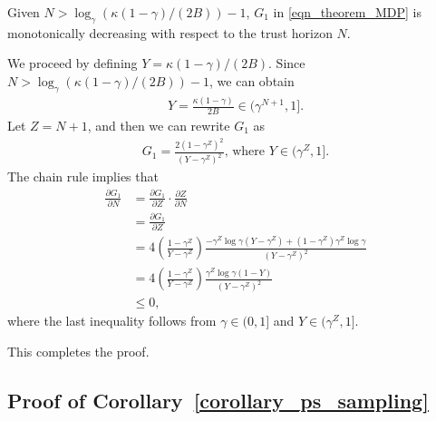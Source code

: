 \begin{lemma}\label{lemma_mono_decrease}
    Given $N > \log_\gamma \left( \kappa (1-\gamma)/(2B) \right)-1$, $G_1$ in \eqref{eqn_theorem_MDP} is monotonically decreasing with respect to the trust horizon $N$.
\end{lemma}
%
%
\begin{myproof}
    We proceed by defining $Y = \kappa (1-\gamma)/(2B)$.
    Since $N > \log_\gamma \left( \kappa (1-\gamma)/(2B) \right)-1$, we can obtain
    \begin{align}
        Y = \frac{\kappa \left( 1-\gamma \right)}{2B} \in (\gamma^{N+1}, 1].
    \end{align}
    Let $Z = N+1$, and then we can rewrite $G_1$ as
    \begin{align}
        G_1 = \frac{ 2 \left( 1-\gamma^{Z}\right)^2}{ \left(Y - \gamma^{Z}\right)^2}, \, \text{where} \,\, Y \in (\gamma^{Z}, 1].
    \end{align}
    The chain rule implies that
    \begin{align}
        \frac{\partial G_1}{\partial N} &= \frac{\partial G_1}{\partial Z} \cdot \frac{\partial Z}{\partial N} \\
        &=\frac{\partial G_1}{\partial Z} \\
        &=4 \left( \frac{1-\gamma^{Z}}{Y - \gamma^{Z}} \right) \frac{-\gamma^{Z} \log \gamma (Y - \gamma^{Z}) + (1-\gamma^{Z}) \gamma^{Z} \log \gamma }{(Y - \gamma^{Z})^2} \\
        &=4 \left( \frac{1-\gamma^{Z}}{Y - \gamma^{Z}} \right) \frac{\gamma^{Z} \log \gamma (1-Y)}{(Y - \gamma^{Z})^2} \\
        &\leq 0,
    \end{align}
    where the last inequality follows from $\gamma \in (0, 1]$ and $Y \in (\gamma^{Z}, 1]$.

    This completes the proof.
    
\end{myproof}













\subsection{Proof of Corollary~\ref{corollary_ps_sampling}}
\label{appendix_omit_proof_corollary_ps_sampling}

